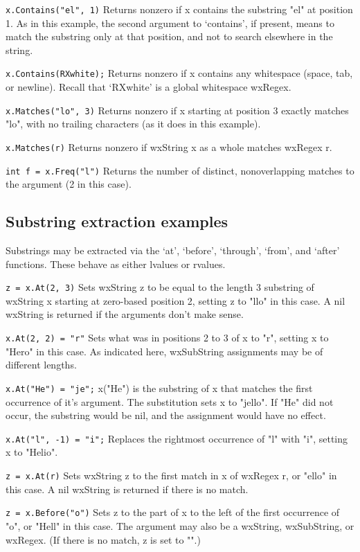 {\tt x.Contains("el", 1)} 
Returns nonzero if x contains the substring "el" at position 1.
As in this example, the second argument to `contains', if present,
means to match the substring only at that position, and not to
search elsewhere in the string.

{\tt x.Contains(RXwhite);} 
Returns nonzero if x contains any whitespace (space, tab, or
newline). Recall that `RXwhite' is a global whitespace wxRegex.

{\tt x.Matches("lo", 3)} 
Returns nonzero if x starting at position 3 exactly matches "lo",
with no trailing characters (as it does in this example).

{\tt x.Matches(r)} 
Returns nonzero if wxString x as a whole matches wxRegex r.

{\tt int f = x.Freq("l")} 
Returns the number of distinct, nonoverlapping matches to the
argument (2 in this case).

\subsection{Substring extraction examples}

Substrings may be extracted via the `at', `before', `through',
`from', and `after' functions.  These behave as either lvalues or
rvalues.

{\tt z = x.At(2, 3)} 
Sets wxString z to be equal to the length 3 substring of wxString x
starting at zero-based position 2, setting z to "llo" in this
case. A nil wxString is returned if the arguments don't make sense.

{\tt x.At(2, 2) = "r"} 
Sets what was in positions 2 to 3 of x to "r", setting x to "Hero"
in this case. As indicated here, wxSubString assignments may be of
different lengths.

{\tt x.At("He") = "je";} 
x("He") is the substring of x that matches the first occurrence of
it's argument. The substitution sets x to "jello". If "He" did not
occur, the substring would be nil, and the assignment would have
no effect.

{\tt x.At("l", -1) = "i";} 
Replaces the rightmost occurrence of "l" with "i", setting x to
"Helio".

{\tt z = x.At(r)} 
Sets wxString z to the first match in x of wxRegex r, or "ello" in this
case. A nil wxString is returned if there is no match.

{\tt z = x.Before("o")} 
Sets z to the part of x to the left of the first occurrence of
"o", or "Hell" in this case. The argument may also be a wxString,
wxSubString, or wxRegex.  (If there is no match, z is set to "".)

